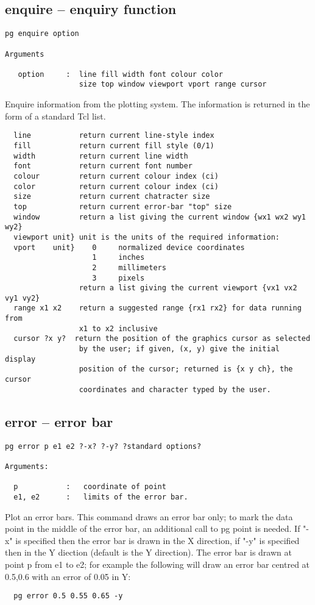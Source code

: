 \subsection{enquire -- enquiry function}
\begin{verbatim}
pg enquire option

Arguments

   option     :  line fill width font colour color
                 size top window viewport vport range cursor
\end{verbatim}
Enquire information from the plotting system.  The information is returned
in the form of a standard Tcl list.
\begin{verbatim}
  line           return current line-style index
  fill           return current fill style (0/1)
  width          return current line width
  font           return current font number
  colour         return current colour index (ci)
  color          return current colour index (ci)
  size           return current chatracter size
  top            return current error-bar "top" size
  window         return a list giving the current window {wx1 wx2 wy1 wy2}
  viewport unit} unit is the units of the required information:
  vport    unit}    0     normalized device coordinates
                    1     inches
                    2     millimeters
                    3     pixels
                 return a list giving the current viewport {vx1 vx2 vy1 vy2}
  range x1 x2    return a suggested range {rx1 rx2} for data running from
                 x1 to x2 inclusive
  cursor ?x y?  return the position of the graphics cursor as selected
                 by the user; if given, (x, y) give the initial display
                 position of the cursor; returned is {x y ch}, the cursor
                 coordinates and character typed by the user.
\end{verbatim}
\subsection{error --  error bar}
\begin{verbatim}
pg error p e1 e2 ?-x? ?-y? ?standard options?

Arguments:

  p           :   coordinate of point
  e1, e2      :   limits of the error bar.
\end{verbatim}
Plot an error bars. This command draws an error bar only; to mark 
the data point in the middle of the error bar, an additional call 
to pg point is needed.  If "-x" is specified then the error bar is
drawn in  the X direction, if "-y" is specified then in the Y
diection (default is the Y direction).  The error bar is drawn at
point p from e1 to e2; for example the following will draw an
error bar centred at 0.5,0.6 with an error of 0.05 in Y:
\begin{verbatim}
  pg error 0.5 0.55 0.65 -y 
\end{verbatim}


